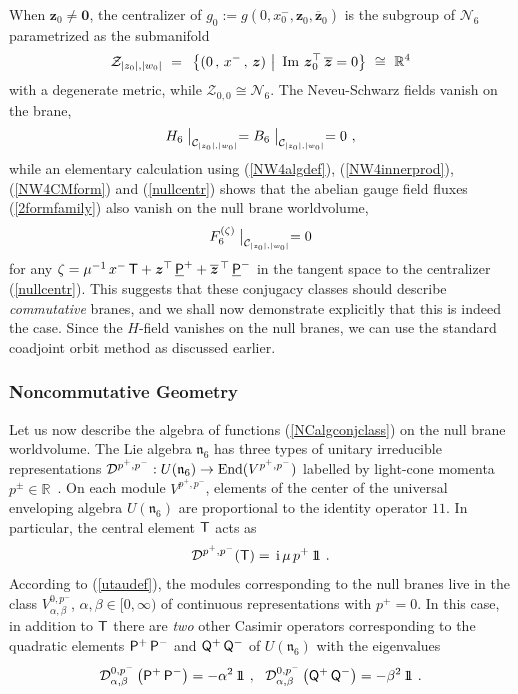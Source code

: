 \documentclass[11pt,a4paper]{article}
\newcommand{\ii}{{\rm i}}
\newcommand{\mbf}[1]{{\boldsymbol {#1} }}
\def\ii{{\,{\rm i}\,}}
\def\P{{\sf P}}
\def\T{{\sf T}}
\def\Q{{\sf Q}}
\def\mz{{\mbf z}}
\newcommand{\real}{{\mathbb R}} %
\newcommand{\id}{{1\!\!1}} %
\newcommand{\beq}{\begin{eqnarray}}
\newcommand{\eeq}{\end{eqnarray}}
\begin{document}
When $\mz_0\neq{\mbf0}$, the centralizer of
$g^{~}_0:=g(0,x^-_0,\mz^{~}_0,\overline{\mz}^{~}_0)$ is the subgroup
of $\mathcal{N}_6$ parametrized as the submanifold
\beq
\mathcal{Z}_{|z_0|,|w_0|}~=~\left.\bigl\{(0\,,\,x^-\,,\,\mz)~\right|~
{\rm Im}~\mz_0^\top\,\overline{\mz}=0\bigr\}~\cong~\real^4
\label{nullcentr}\eeq
with a degenerate metric, while
$\mathcal{Z}_{0,0}\cong\mathcal{N}_6$. The Neveu-Schwarz fields vanish
on the brane,
\beq
H_6\bigm|_{\mathcal{C}_{|z_0|,|w_0|}}=
B_6\bigm|_{\mathcal{C}_{|z_0|,|w_0|}}=0 \ ,
\label{H6B6null0}\eeq
while an elementary calculation using (\ref{NW4algdef}),
(\ref{NW4innerprod}), (\ref{NW4CMform}) and
(\ref{nullcentr}) shows that the abelian gauge field fluxes
(\ref{2formfamily}) also vanish on the null brane worldvolume,
\beq
F^{(\zeta)}_6\bigm|_{\mathcal{C}_{|z_0|,|w_0|}}=0
\label{nullF60}\eeq
for any
$\zeta=\mu^{-1}\,x^-\,\T+\mz^\top\,\underline{\P}^++
\overline{\mz}{}^{\,\top}\,\underline{\P}^-$ in the tangent space to
the centralizer (\ref{nullcentr}). This
suggests that these conjugacy classes should describe {\it
  commutative} branes, and we shall now demonstrate explicitly that
this is indeed the case. Since the $H$-field vanishes on the null
branes, we can use the standard coadjoint orbit method as discussed
earlier.

\subsubsection*{Noncommutative Geometry}

Let us now describe the algebra of functions (\ref{NCalgconjclass}) on
the null brane worldvolume. The Lie algebra $\mathfrak{n}_6$
has three types of unitary irreducible representations
$\mathcal{D}^{p^+,p^-}:U(\mathfrak{n}_6)\to{\rm End}(V^{p^+,p^-})$ labelled by
light-cone momenta $p^\pm\in\real$~\cite{BAKZ1,CFS1,KK1}. On each
module $V^{p^+,p^-}$, elements of the center of the universal
enveloping algebra $U(\mathfrak{n}_6)$ are proportional to the
identity operator $\id$. In particular, the central element $\T$ acts
as
\beq
\mathcal{D}^{p^+,p^-}(\T)=\ii\mu\,p^+\,\id \ .
\label{Tirrepgen}\eeq
According to (\ref{utaudef}), the modules corresponding to the null
branes live in the class $V^{0,p^-}_{\alpha,\beta}$,
$\alpha,\beta\in[0,\infty)$ of continuous representations with
$p^+=0$. In this case, in addition to $\T$ there are {\it two} other
Casimir operators corresponding to the quadratic elements $\P^+\,\P^-$
and $\Q^+\,\Q^-$ of $U(\mathfrak{n}_6)$ with the eigenvalues
\beq
\mathcal{D}^{0,p^-}_{\alpha,\beta}\left(\P^+\,\P^-\right)=-\alpha^2\,\id \ , ~~
\mathcal{D}^{0,p^-}_{\alpha,\beta}\left(\Q^+\,\Q^-\right)=-\beta^2\,\id \ .
\label{otherCasimirs}\eeq
\end{document}
